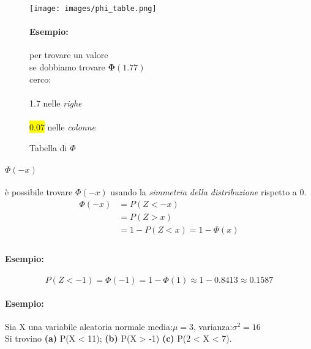 \documentclass[]{article}
\begin{document}
    \begin{figure}[H]
        \caption{Tabella di $\Phi$}
        \begin{minipage}{0.59\textwidth}
            \texttt{[image: images/phi\_table.png]}
        \end{minipage}
        \begin{minipage}{0.4\textwidth}
            \paragraph{Esempio:} per trovare un valore \\
            se dobbiamo trovare $\boldsymbol{\Phi(1.77)}$ \\
            cerco: \\ \\
            \colorbox{bittersweet}{1.7} nelle \textit{righe} \\ \\
            \colorbox{yellow}{0.07} nelle \textit{colonne}
        \end{minipage}
    \end{figure}
    \newpage
    \paragraph{$\Phi(-x)$} è possibile trovare $\Phi(-x)$ usando la \textit{simmetria della distribuzione} rispetto a 0. \\
    \begin{equation*}
        \begin{split}
            \Phi(-x) &= P(Z < -x) \\
            &= P(Z > x) \\
            &= 1 - P(Z < x) = 1 - \Phi(x) \\
        \end{split}
    \end{equation*}
    \paragraph{Esempio:}
    \[ P(Z < -1) = \Phi(-1) = 1 -\Phi(1) \approx 1 - 0.8413 \approx 0.1587 \]
    
    \paragraph{Esempio:} Sia X una variabile aleatoria normale media:$\mu = 3$, varianza:$\sigma^2 = 16$ \\
    Si trovino \textbf{(a)} P(X < 11); \textbf{(b)} P(X > -1) \textbf{(c)} P(2 < X < 7).
\end{document}
